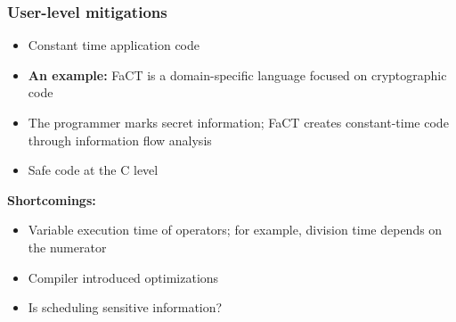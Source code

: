 \begin{frame}
\frametitle{User-level mitigations}
\begin{itemize}
  \item Constant time application code
  \item \textbf{An example:} FaCT is a domain-specific language focused on cryptographic code
  \item The programmer marks secret information; FaCT creates constant-time code through information flow analysis
  \item Safe code at the C level
\end{itemize}
\vspace{0.1cm}
\textbf{Shortcomings:}
\begin{itemize}
  \item Variable execution time of operators; for example, division time depends on the numerator
  \item Compiler introduced optimizations
  \item Is scheduling sensitive information?
\end{itemize}

\end{frame}

